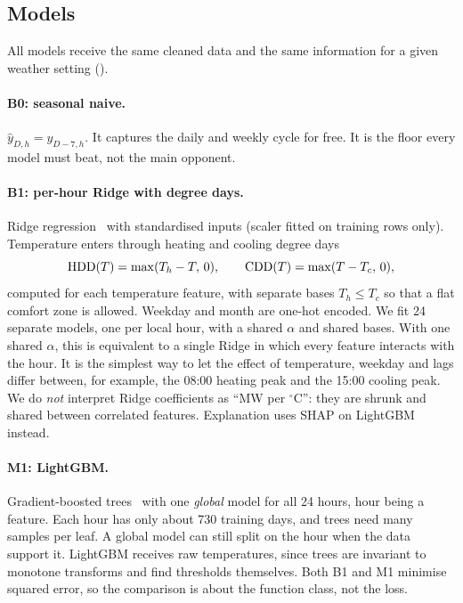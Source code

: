 \subsection{Models}
\label{sec:models}

All models receive the same cleaned data and the same information for a given weather setting
().

\paragraph{B0: seasonal naive.} $\hat y_{D,h}=y_{D-7,h}$. It captures the daily and weekly cycle
for free. It is the floor every model must beat, not the main opponent.

\paragraph{B1: per-hour Ridge with degree days.}
Ridge regression~\cite{hoerl1970ridge} with standardised inputs (scaler fitted on training rows
only). Temperature enters through heating and cooling degree days
\begin{equation}
  \mathrm{HDD}(T)=\max(T_h-T,\,0), \qquad \mathrm{CDD}(T)=\max(T-T_c,\,0),
  \label{eq:degree-days}
\end{equation}
computed for each temperature feature, with separate bases $T_h\le T_c$ so that a flat comfort zone
is allowed. Weekday and month are one-hot encoded. We fit 24 separate models, one per local hour,
with a shared $\alpha$ and shared bases. With one shared $\alpha$, this is equivalent to a single Ridge
in which every feature interacts with the hour. It is the simplest way to let the effect of
temperature, weekday and lags differ between, for example, the 08:00 heating peak and the 15:00
cooling peak. We do \emph{not} interpret Ridge coefficients as ``MW per $^\circ$C'': they are shrunk
and shared between correlated features. Explanation uses SHAP on LightGBM instead.

\paragraph{M1: LightGBM.}
Gradient-boosted trees~\cite{ke2017lightgbm} with one \emph{global} model for all 24 hours, hour
being a feature. Each hour has only about 730 training days, and trees need many samples per leaf.
A global model can still split on the hour when the data support it. LightGBM receives raw
temperatures, since trees are invariant to monotone transforms and find thresholds themselves. Both
B1 and M1 minimise squared error, so the comparison is about the function class, not the loss.

